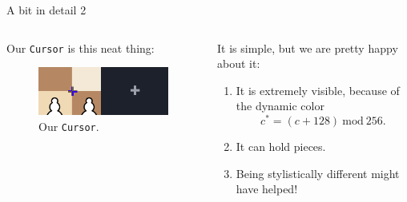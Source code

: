 \documentclass[english]{beamer}
\begin{document}
\begin{frame}{A bit in detail 2}
    \begin{columns}[T]
        \begin{column}{.5\textwidth}
            Our \texttt{Cursor} is this neat thing:
            \begin{figure}
                \centering
                \includegraphics[width=.98\textwidth]{images/cursor_comparison.png}
                \caption{Our \texttt{Cursor}.}
            \end{figure}
        \end{column}
        \begin{column}{.5\textwidth}
            It is simple, but we are pretty happy about it:
            \begin{enumerate}
                \item It is extremely visible, because of the dynamic color
                \begin{equation*}
                    c^* = (c + 128)\ \mathrm{mod}\ 256.
                \end{equation*}
                \item It can hold pieces.
                \item Being stylistically different might have helped!
            \end{enumerate}
        \end{column}
    \end{columns}
\end{frame}
\end{document}
